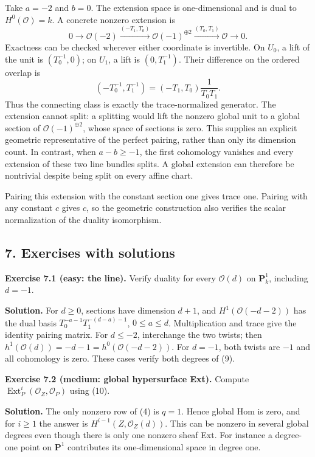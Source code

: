 \documentclass[11pt]{article}
\begin{document}
Take \(a=-2\) and \(b=0\). The extension space is one-dimensional and is
dual to \(H^0(\mathcal O)=k\). A concrete nonzero extension is \[
0\to\mathcal O(-2)
 \xrightarrow{(-T_1,T_0)}\mathcal O(-1)^{\oplus2}
 \xrightarrow{(T_0,T_1)}\mathcal O\to0.
\] Exactness can be checked wherever either coordinate is invertible. On
\(U_0\), a lift of the unit is \((T_0^{-1},0)\); on \(U_1\), a lift is
\((0,T_1^{-1})\). Their difference on the ordered overlap is \[
(-T_0^{-1},T_1^{-1})
 =(-T_1,T_0)\frac1{T_0T_1}.
\] Thus the connecting class is exactly the trace-normalized generator.
The extension cannot split: a splitting would lift the nonzero global
unit to a global section of \(\mathcal O(-1)^{\oplus2}\), whose space of
sections is zero. This supplies an explicit geometric representative of
the perfect pairing, rather than only its dimension count. In contrast,
when \(a-b\geq-1\), the first cohomology vanishes and every extension of
these two line bundles splits. A global extension can therefore be
nontrivial despite being split on every affine chart.

Pairing this extension with the constant section one gives trace one.
Pairing with any constant \(c\) gives \(c\), so the geometric
construction also verifies the scalar normalization of the duality
isomorphism.

\subsection{7. Exercises with solutions}\label{exercises-with-solutions}

\textbf{Exercise 7.1 (easy: the line).} Verify duality for every
\(\mathcal O(d)\) on \(\mathbf P^1_k\), including \(d=-1\).

\textbf{Solution.} For \(d\geq0\), sections have dimension \(d+1\), and
\(H^1(\mathcal O(-d-2))\) has the dual basis
\(T_0^{-a-1}T_1^{-(d-a)-1}\), \(0\leq a\leq d\). Multiplication and
trace give the identity pairing matrix. For \(d\leq-2\), interchange the
two twists; then \(h^1(\mathcal O(d))=-d-1=h^0(\mathcal O(-d-2))\). For
\(d=-1\), both twists are \(-1\) and all cohomology is zero. These cases
verify both degrees of (9).

\textbf{Exercise 7.2 (medium: global hypersurface Ext).} Compute
\(\operatorname{Ext}^i_P(\mathcal O_Z,\mathcal O_P)\) using (10).

\textbf{Solution.} The only nonzero row of (4) is \(q=1\). Hence global
Hom is zero, and for \(i\geq1\) the answer is
\(H^{i-1}(Z,\mathcal O_Z(d))\). This can be nonzero in several global
degrees even though there is only one nonzero sheaf Ext. For instance a
degree-one point on \(\mathbf P^1\) contributes its one-dimensional
space in degree one.
\end{document}
